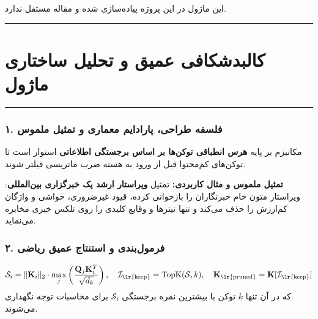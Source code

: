 \clearpage
{}
\vspace*{0.2cm}

این ماژول در این پروژه پیاده‌سازی شده و مقاله مستقل ندارد.
\noindent\rule{\textwidth}{1.2pt}
\vspace*{0.1cm}
\section{کالبدشکافی عمیق و تحلیل ساختاری ماژول }
\label{sec:mod_token_compressed_attention}
\vspace*{-0.2cm}
\noindent\rule{\textwidth}{0.5pt}
\vspace*{0.3cm}

\subsubsection*{۱. فلسفه طراحی، پارادایم معماری و تمثیل ملموس}
مکانیزم  بر پایه \textbf{هرس انطباقی توکن‌ها بر اساس برجستگی اطلاعاتی } استوار است تا توکن‌های کم‌محتوا قبل از ورود به هسته ضرب ماتریسی فیلتر شوند.

\textbf{تمثیل ملموس و مثال کاربردی:}
تمثیل \textbf{ویراستار ارشد یک خبرگزاری بین‌المللی}: ویراستار متون خام خبرنگاران را بازخوانی کرده، قیود غیرضروری، حواشی و واژگان کم‌ارزش را حذف می‌کند و تنها تیترها و وقایع کلیدی را روی تلکس خبری مخابره می‌نماید.

\subsubsection*{۲. فرمول‌بندی و استنتاج عمیق ریاضی }
\begin{equation}
\mathcal{S}_i = \|\mathbf{K}_i\|_2 \cdot \max_j \left(\frac{\mathbf{Q}_j \mathbf{K}_i^T}{\sqrt{d_k}}\right), \quad \mathcal{I}_{\text{\lr{keep}}} = \operatorname{TopK}(\mathcal{S}, k), \quad \mathbf{K}_{\text{\lr{pruned}}} = \mathbf{K}[\mathcal{I}_{\text{\lr{keep}}}]
\end{equation}
که در آن تنها $k$ توکن با بیشترین نمره برجستگی $\mathcal{S}_i$ برای محاسبات توجه نگهداری می‌شوند.

